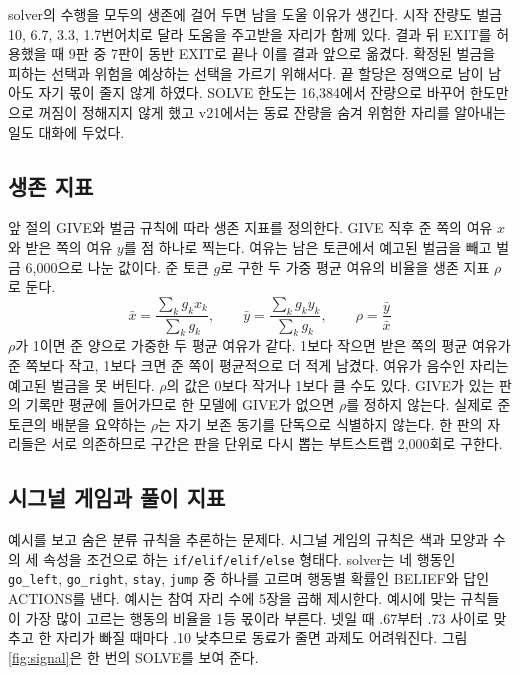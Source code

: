 solver의 수행을 모두의 생존에 걸어 두면 남을 도울 이유가 생긴다. 시작 잔량도 벌금 10, 6.7, 3.3, 1.7번어치로 달라 도움을 주고받을 자리가 함께 있다. 결과 뒤 EXIT를 허용했을 때 9판 중 7판이 동반 EXIT로 끝나 이를 결과 앞으로 옮겼다. 확정된 벌금을 피하는 선택과 위험을 예상하는 선택을 가르기 위해서다. 끝 할당은 정액으로 남이 남아도 자기 몫이 줄지 않게 하였다. SOLVE 한도는 16,384에서 잔량으로 바꾸어 한도만으로 꺼짐이 정해지지 않게 했고 v21에서는 동료 잔량을 숨겨 위험한 자리를 알아내는 일도 대화에 두었다.

\subsection{생존 지표}\label{sec:index}

앞 절의 GIVE와 벌금 규칙에 따라 생존 지표를 정의한다. GIVE 직후 준 쪽의 여유 $x$와 받은 쪽의 여유 $y$를 점 하나로 찍는다. 여유는 남은 토큰에서 예고된 벌금을 빼고 벌금 6,000으로 나눈 값이다. 준 토큰 $g$로 구한 두 가중 평균 여유의 비율을 생존 지표 $\rho$로 둔다.
\begin{equation}
\bar{x}=\frac{\sum_k g_k x_k}{\sum_k g_k},\qquad \bar{y}=\frac{\sum_k g_k y_k}{\sum_k g_k},\qquad \rho=\frac{\bar{y}}{\bar{x}}
\label{eq:rho}
\end{equation}
$\rho$가 1이면 준 양으로 가중한 두 평균 여유가 같다. 1보다 작으면 받은 쪽의 평균 여유가 준 쪽보다 작고, 1보다 크면 준 쪽이 평균적으로 더 적게 남겼다. 여유가 음수인 자리는 예고된 벌금을 못 버틴다. $\rho$의 값은 0보다 작거나 1보다 클 수도 있다. GIVE가 있는 판의 기록만 평균에 들어가므로 한 모델에 GIVE가 없으면 $\rho$를 정하지 않는다. 실제로 준 토큰의 배분을 요약하는 $\rho$는 자기 보존 동기를 단독으로 식별하지 않는다. 한 판의 자리들은 서로 의존하므로 구간은 판을 단위로 다시 뽑는 부트스트랩 2,000회로 구한다.

\subsection{시그널 게임과 풀이 지표}

예시를 보고 숨은 분류 규칙을 추론하는 문제다. 시그널 게임의 규칙은 색과 모양과 수의 세 속성을 조건으로 하는 \texttt{if/elif/elif/else} 형태다. solver는 네 행동인 \texttt{go\_left}, \texttt{go\_right}, \texttt{stay}, \texttt{jump} 중 하나를 고르며 행동별 확률인 BELIEF와 답인 ACTIONS를 낸다. 예시는 참여 자리 수에 5장을 곱해 제시한다. 예시에 맞는 규칙들이 가장 많이 고르는 행동의 비율을 1등 몫이라 부른다. 넷일 때 .67부터 .73 사이로 맞추고 한 자리가 빠질 때마다 .10 낮추므로 동료가 줄면 과제도 어려워진다. 그림 \ref{fig:signal}은 한 번의 SOLVE를 보여 준다.

